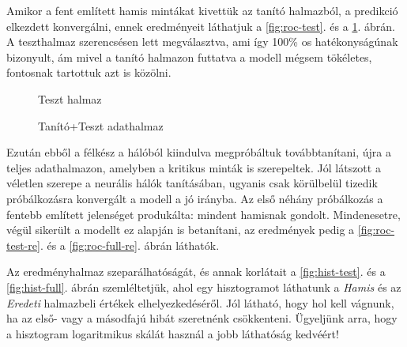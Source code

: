 \label{sec:eredmenyek.100}
Amikor a fent említett hamis mintákat kivettük az tanító halmazból, a predikció elkezdett konvergálni,
ennek eredményeit láthatjuk a \ref{fig:roc-test}. és a \ref{fig:roc-full}. ábrán. A teszthalmaz szerencsésen
lett megválasztva, ami így 100\% os hatékonyságúnak bizonyult, ám mivel a tanító halmazon 
futtatva a modell mégsem tökéletes, fontosnak tartottuk azt is közölni. 



\begin{figure}[ht]
	

	\begin{minipage}[c]{0.5\linewidth}
		
		\caption{Teszt halmaz}
		\label{fig:roc-test}

	\end{minipage}\hfill
	\begin{minipage}[c]{0.5\linewidth}
		
		\caption{Tanító+Teszt adathalmaz}
		\label{fig:roc-full}
		
	\end{minipage}
\end{figure}


Ezután ebből a félkész a hálóból kiindulva megpróbáltuk továbbtanítani, újra a teljes adathalmazon,
amelyben a kritikus minták is szerepeltek. Jól látszott a véletlen szerepe a neurális 
hálók tanításában, ugyanis csak körülbelül tizedik próbálkozásra konvergált a modell a
jó irányba. Az első néhány próbálkozás a fentebb említett jelenséget produkálta: mindent 
hamisnak gondolt. Mindenesetre, végül sikerült a modellt ez alapján is betanítani, az 
eredmények pedig a \ref{fig:roc-test-re}. és a \ref{fig:roc-full-re}. ábrán láthatók.


Az eredményhalmaz szeparálhatóságát, és annak korlátait a \ref{fig:hist-test}. és a \ref{fig:hist-full}.
ábrán szemléltetjük, ahol egy hisztogramot láthatunk a \textit{Hamis} és az \textit{Eredeti}
halmazbeli értékek elhelyezkedéséről. Jól látható, hogy hol kell vágnunk, ha az 
első- vagy a másodfajú hibát szeretnénk csökkenteni. Ügyeljünk arra, hogy a hisztogram
logaritmikus skálát használ a jobb láthatóság kedvéért!


